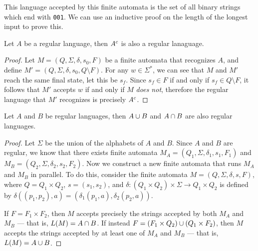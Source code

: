 \begin{exmp}
    This language accepted by this finite automata is the set of all binary strings which end with \texttt{001}. We can use an inductive proof on the length of the longest input to prove this.
\end{exmp}

\begin{prop}\label{regular-language-complement}
    Let $A$ be a regular language, then $A^{c}$ is also a regular lanaguage.
\end{prop}

\begin{proof}
    Let $M = (Q, \Sigma, \delta, s_0, F)$ be a finite automata that recognizes $A$, and define $M' = (Q, \Sigma, \delta, s_0, Q \setminus F)$. For any $w \in \Sigma^{*}$, we can see that $M$ and $M'$ reach the same final state, let this be $s_f$. Since $s_f \in F$ if and only if $s_f \in Q \setminus F$, it follows that $M'$ accepts $w$ if and only if $M$ \emph{does not}, therefore the regular language that $M'$ recognizes is precisely $A^{c}$.
\end{proof}

\begin{thm}\label{regular-language-union-intersection}
    Let $A$ and $B$ be regular languages, then $A \cup B$ and $A \cap B$ are also regular languages.
\end{thm}

\begin{proof}
    Let $\Sigma$ be the union of the alphabets of $A$ and $B$. Since $A$ and $B$ are regular, we know that there exists finite automata $M_A = \left(Q_1, \Sigma, \delta_1, s_1, F_1\right)$ and $M_B = \left(Q_2, \Sigma, \delta_2, s_2, F_2\right)$. Now we construct a new finite automata that runs $M_A$ and $M_B$ in parallel. To do this, consider the finite automata $M = \left(Q, \Sigma, \delta, s, F\right)$, where $Q = Q_1 \times Q_2$, $s = (s_1, s_2)$, and  $\delta: (Q_1 \times Q_2) \times \Sigma \to Q_1 \times Q_2$ is defined by $\delta\left((p_1, p_2), a\right) = \left(\delta_1\left(p_1, a\right), \delta_2\left(p_2, a\right)\right)$.
    
    If $F = F_1 \times F_2$, then $M$ accepts precisely the strings accepted by both $M_A$ and $M_B$ --- that is, $L(M) = A \cap B$. If instead $F = \left(F_1 \times Q_2\right) \cup \left(Q_1 \times F_2\right)$, then $M$ accepts the strings accepted by at least one of $M_A$ and $M_B$ --- that is, $L(M) = A \cup B$.
\end{proof}

